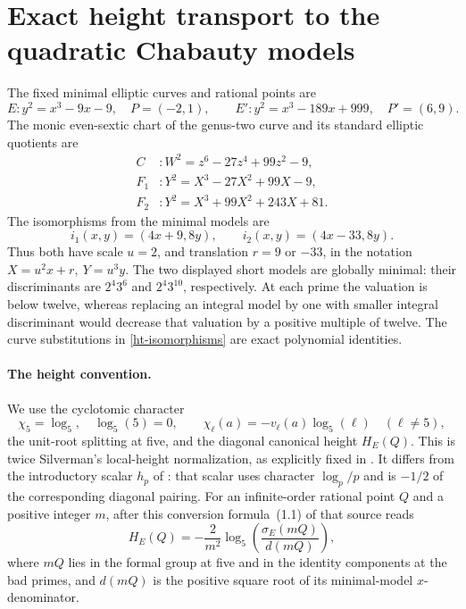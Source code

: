 \section{Exact height transport to the quadratic Chabauty models}
\label{sec:height-normalization}

The fixed minimal elliptic curves and rational points are
\[
 E:y^2=x^3-9x-9,\quad P=(-2,1),\qquad
 E':y^2=x^3-189x+999,\quad P'=(6,9).
\]
The monic even-sextic chart of the genus-two curve and its standard
elliptic quotients are
\begin{align}
 C&:W^2=z^6-27z^4+99z^2-9,\\
 F_1&:Y^2=X^3-27X^2+99X-9,\\
 F_2&:Y^2=X^3+99X^2+243X+81.
 \label{ht-standard-models}
\end{align}
The isomorphisms from the minimal models are
\begin{equation}
 i_1(x,y)=(4x+9,8y),\qquad
 i_2(x,y)=(4x-33,8y).
 \label{ht-isomorphisms}
\end{equation}
Thus both have scale \(u=2\), and translation \(r=9\) or \(-33\),
in the notation \(X=u^2x+r,\ Y=u^3y\).
The two displayed short models are globally minimal: their discriminants
are \(2^4 3^6\) and \(2^4 3^{10}\), respectively. At each prime the
valuation is below twelve, whereas replacing an integral model by one
with smaller integral discriminant would decrease that valuation by
a positive multiple of twelve. The curve substitutions in
\eqref{ht-isomorphisms} are exact polynomial identities.

\paragraph{The height convention.}
We use the cyclotomic character
\[
 \chi_5=\log_5,\quad \log_5(5)=0,\qquad
 \chi_\ell(a)=-v_\ell(a)\log_5(\ell)\quad(\ell\ne5),
\]
the unit-root splitting at five, and the diagonal canonical height
\(H_E(Q)\). This is twice Silverman's local-height normalization,
as explicitly fixed in
\cite[\S8.3, printed p.~35]{BalakrishnanDograQCI}.
It differs from the introductory scalar \(h_p\) of
\cite{MazurSteinTateHeight}: that scalar uses character \(\log_p/p\)
and is \(-1/2\) of the corresponding diagonal pairing.
For an infinite-order rational point \(Q\) and a positive integer \(m\),
after this conversion formula~(1.1) of that source reads
\begin{equation}
 H_E(Q)=-\frac{2}{m^2}
       \log_5\!\left(\frac{\sigma_E(mQ)}{d(mQ)}\right),
 \label{ht-sigma-height}
\end{equation}
where \(mQ\) lies in the formal group at five and in the identity
components at the bad primes, and \(d(mQ)\) is the positive square
root of its minimal-model \(x\)-denominator.

